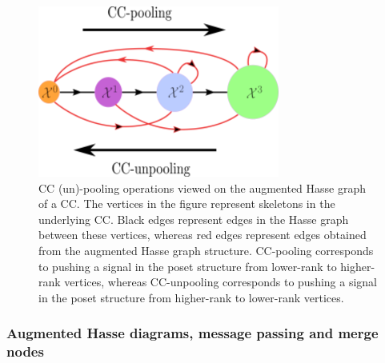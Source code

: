 \documentclass[
  12pt,
]{krantz}
\begin{document}
\begin{figure}

{\centering \includegraphics{figures/hasse_graph_pooling_scaled} 

}

\caption{CC (un)-pooling operations viewed on the augmented Hasse graph of a CC. The vertices in the figure represent skeletons in the underlying CC. Black edges represent edges in the Hasse graph between these vertices, whereas red edges represent edges obtained from the augmented Hasse graph structure. CC-pooling corresponds to pushing a signal in the poset structure from lower-rank to higher-rank vertices, whereas CC-unpooling corresponds to pushing a signal in the poset structure from higher-rank to lower-rank vertices.}\label{fig:hasse-graph-pooling}
\end{figure}

\subsubsection{Augmented Hasse diagrams, message passing and merge
nodes}\label{augmented-hasse-diagrams-message-passing-and-merge-nodes}
\end{document}
